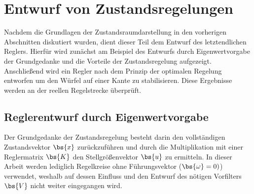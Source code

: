 \section{Entwurf von Zustandsregelungen}
Nachdem die Grundlagen der Zustandsraumdarstellung in den vorherigen Abschnitten diskutiert wurden, dient dieser Teil dem Entwurf des letztendlichen Reglers. Hierfür wird zunächst am Beispiel des Entwurfs durch Eigenwertvorgabe der Grundgedanke und die Vorteile der Zustandsregelung aufgezeigt. Anschließend wird ein Regler nach dem Prinzip der optimalen Regelung entworfen um den Würfel auf einer Kante zu stabilisieren. Diese Ergebnisse werden an der reellen Regelstrecke überprüft.

\subsection{Reglerentwurf durch Eigenwertvorgabe}
Der Grundgedanke der Zustandsregelung besteht darin den vollständigen Zustandsvektor $\bs{x}$ zurückzuführen und durch die Multiplikation mit einer Reglermatrix $\bs{K}$ den Stellgrößenvektor $\bs{u}$ zu ermitteln. In dieser Arbeit werden lediglich Regelkreise ohne Führungsvektor ($\bs{\omega}=0)$) verwendet, weshalb auf dessen Einfluss und den Entwurf des nötigen Vorfilters $\bs{V}$ nicht weiter eingegangen wird.

